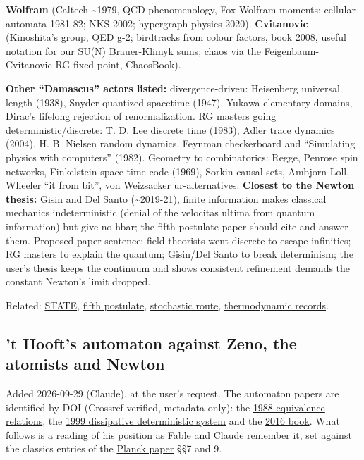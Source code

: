 \documentclass[11pt,a4paper]{article}
\begin{document}
\textbf{Wolfram} (Caltech \textasciitilde1979, QCD phenomenology,
Fox-Wolfram moments; cellular automata 1981-82; NKS 2002; hypergraph
physics 2020). \textbf{Cvitanovic} (Kinoshita's group, QED g-2;
birdtracks from colour factors, book 2008, useful notation for our SU(N)
Brauer-Klimyk sums; chaos via the Feigenbaum-Cvitanovic RG fixed point,
ChaosBook).

\textbf{Other ``Damascus'' actors listed:} divergence-driven: Heisenberg
universal length (1938), Snyder quantized spacetime (1947), Yukawa
elementary domains, Dirac's lifelong rejection of renormalization. RG
masters going deterministic/discrete: T. D. Lee discrete time (1983),
Adler trace dynamics (2004), H. B. Nielsen random dynamics, Feynman
checkerboard and ``Simulating physics with computers'' (1982). Geometry
to combinatorics: Regge, Penrose spin networks, Finkelstein space-time
code (1969), Sorkin causal sets, Ambjorn-Loll, Wheeler ``it from bit'',
von Weizsacker ur-alternatives. \textbf{Closest to the Newton thesis:}
Gisin and Del Santo (\textasciitilde2019-21), finite information makes
classical mechanics indeterministic (denial of the velocitas ultima from
quantum information) but give no hbar; the fifth-postulate paper should
cite and answer them. Proposed paper sentence: field theorists went
discrete to escape infinities; RG masters to explain the quantum;
Gisin/Del Santo to break determinism; the user's thesis keeps the
continuum and shows consistent refinement demands the constant Newton's
limit dropped.

Related: \href{../research/STATE.md}{STATE},
\href{principia-fifth-postulate.md}{fifth postulate},
\href{stochastic-route-velocitas-ultima.md}{stochastic route},
\href{thermodynamic-records-no-floor.md}{thermodynamic records}.

\hypertarget{t-hoofts-automaton-against-zeno-the-atomists-and-newton}{%
\subsection{'t Hooft's automaton against Zeno, the atomists and
Newton}\label{t-hoofts-automaton-against-zeno-the-atomists-and-newton}}

Added 2026-09-29 (Claude), at the user's request. The automaton papers
are identified by DOI (Crossref-verified, metadata only): the
\href{https://doi.org/10.1007/BF01011560}{1988 equivalence relations},
the \href{https://doi.org/10.1088/0264-9381/16/10/316}{1999 dissipative
deterministic system} and the
\href{https://doi.org/10.1007/978-3-319-41285-6}{2016 book}. What
follows is a reading of his position as Fable and Claude remember it,
set against the classics entries of the
\href{planck-gap-paper.md}{Planck paper} §§7 and 9.
\end{document}
